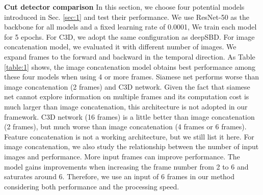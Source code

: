 \documentclass[runningheads]{llncs}
\begin{document}
\textbf{Cut detector comparison} In this section, we choose four potential models introduced in Sec. \ref{sec:1} and test their performance. We use ResNet-50 as the backbone for all models and a fixed learning rate of 0.0001, We train each model for 5 epochs. For C3D, we adopt the same configuration as deepSBD. For image concatenation model, we evaluated it with different number of images. We expand  frames to the forward and backward in the temporal direction. As Table \ref{table:1} shows, the image concatenation model obtains best performance among these four models when using 4 or more frames. Siamese net performs worse than image concatenation (2 frames) and C3D network. Given the fact that siamese net cannot explore information on multiple frames and its computation cost is much larger than image concatenation, this architecture is not adopted in our framework. C3D network (16 frames) is a little better than image concatenation (2 frames), but much worse than image concatenation (4 frames or 6 frames). Feature concatenation is not a working architecture, but we still list it here. For image concatenation, we also study the relationship between the number of input images and performance. More input frames can improve performance. The model gains improvements when increasing the frame number from 2 to 6 and saturates around 6. Therefore, we use an input of 6 frames in our method considering both performance and the processing speed. 
\end{document}
